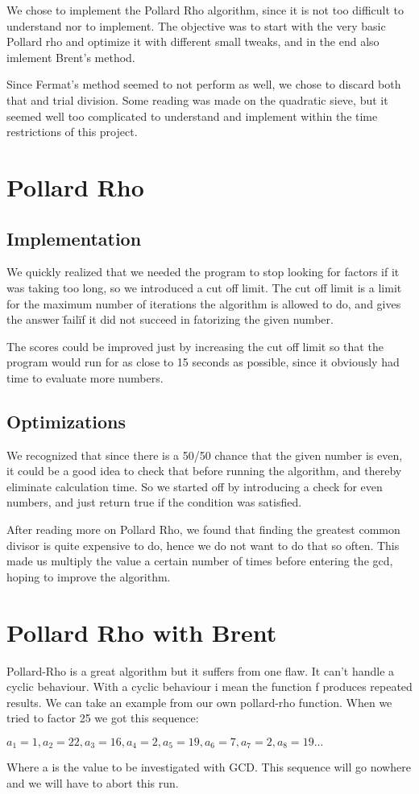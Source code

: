 \documentclass[a4paper, 12pt]{report}
\begin{document}
We chose to implement the Pollard Rho algorithm, since it is not too difficult to understand nor to implement. The objective was to start with the very basic Pollard rho and optimize it with different small tweaks, and in the end also imlement Brent's method.

Since Fermat's method seemed to not perform as well, we chose to discard both that and trial division. Some reading was made on the quadratic sieve, but it seemed well too complicated to understand and implement within the time restrictions of this project.

\section{Pollard Rho}
\subsection{Implementation}

We quickly realized that we needed the program to stop looking for factors if it was taking too long, so we introduced a cut off limit. The cut off limit is a limit for the maximum number of iterations the algorithm is allowed to do, and gives the answer \"fail\" if it did not succeed in fatorizing the given number. 

The scores could be improved just by increasing the cut off limit so that the program would run for as close to 15 seconds as possible, since it obviously had time to evaluate more numbers.

\subsection{Optimizations}
We recognized that since there is a 50/50 chance that the given number is even, it could be a good idea to check that before running the algorithm, and thereby eliminate calculation time. So we started off by introducing a check for even numbers, and just return true if the condition was satisfied.

After reading more on Pollard Rho, we found that finding the greatest common divisor is quite expensive to do, hence we do not want to do that so often. This made us multiply the value a certain number of times before entering the gcd, hoping to improve the algorithm.

\section{Pollard Rho with Brent}
Pollard-Rho is a great algorithm but it suffers from one flaw. It can't handle a cyclic behaviour. With a cyclic behaviour i mean the function f produces repeated results. We can take an example from our own pollard-rho function. When we tried to factor 25 we got this sequence:
\begin{center}
$a_1=1, a_2=22, a_3=16, a_4=2, a_5=19, a_6=7, a_7=2, a_8=19...$
\end{center}
Where a is the value to be investigated with GCD. This sequence will go nowhere and we will have to abort this run.
\end{document}
